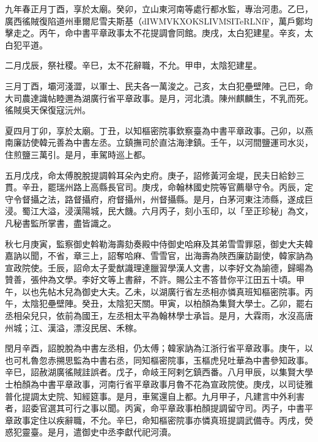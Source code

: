 
\begin{pinyinscope}

 九年春正月丁酉，享於太廟。癸卯，立山東河南等處行都水監，專治河患。乙巳，廣西徭賊復陷道州車爾尼雪夫斯基（dIWMVKXOKSLIVMSITeRLNfF，萬戶鄭均擊走之。丙午，命中書平章政事太不花提調會同館。庚戌，太白犯建星。辛亥，太白犯平道。



 二月戊辰，祭社稷。辛巳，太不花辭職，不允。甲申，太陰犯建星。



 三月丁酉，壩河淺澀，以軍士、民夫各一萬浚之。己亥，太白犯壘壁陣。己巳，命大司農達識帖睦邇為湖廣行省平章政事。是月，河北潰。陳州麒麟生，不乳而死。徭賊吳天保復寇沅州。



 夏四月丁卯，享於太廟。丁丑，以知樞密院事欽察臺為中書平章政事。己卯，以燕南廉訪使韓元善為中書左丞。立鎮撫司於直沽海津鎮。壬午，以河間鹽運司水災，住煎鹽三萬引。是月，車駕時巡上都。



 五月戊戌，命太傅脫脫提調斡耳朵內史府。庚子，詔修黃河金堤，民夫日給鈔三貫。辛丑，罷瑞州路上高縣長官司。庚戌，命翰林國史院等官薦舉守令。丙辰，定守令督攝之法，路督攝府，府督攝州，州督攝縣。是月，白茅河東注沛縣，遂成巨浸。蜀江大溢，浸漢陽城，民大饑。六月丙子，刻小玉印，以「至正珍秘」為文，凡秘書監所掌書，盡皆識之。



 秋七月庚寅，監察御史斡勒海壽劾奏殿中侍御史哈麻及其弟雪雪罪惡，御史大夫韓嘉訥以聞，不省，章三上，詔奪哈麻、雪雪官，出海壽為陜西廉訪副使，韓家訥為宣政院使。壬辰，詔命太子愛猷識理達臘習學漢人文書，以李好文為諭德，歸暘為贊善，張仲為文學。李好文等上書辭，不許。賜公主不答昔你平江田五十頃。甲午，以也先帖木兒為御史大夫。乙未，以湖廣行省左丞相亦憐真班知樞密院事。丙午，太陰犯壘壁陣。癸丑，太陰犯天關。甲寅，以柏顏為集賢大學士。乙卯，罷右丞相朵兒只，依前為國王，左丞相太平為翰林學士承旨。是月，大霖雨，水沒高唐州城；江、漢溢，漂沒民居、禾稼。



 閏月辛酉，詔脫脫為中書左丞相，仍太傅；韓家訥為江浙行省平章政事。庚午，以也可札魯忽赤搠思監為中書右丞，同知樞密院事，玉樞虎兒吐華為中書參知政事。辛巳，詔赦湖廣徭賊詿誤者。戊子，命岐王阿剌乞鎮西番。八月甲辰，以集賢大學士柏顏為中書平章政事，河南行省平章政事月魯不花為宣政院使。庚戌，以司徒雅普化提調太史院、知經筵事。是月，車駕還自上都。九月甲子，凡建言中外利害者，詔委官選其可行之事以聞。丙寅，命平章政事柏顏提調留守司。丙子，中書平章政事定住以疾辭職，不允。辛巳，命知樞密院事亦憐真班提調武備寺。丙戌，熒惑犯靈臺。是月，遣御史中丞李獻代祀河瀆。




\end{pinyinscope}
